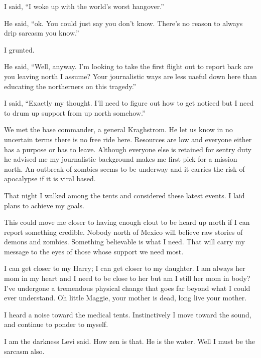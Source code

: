 I said, ``I woke up with the world's worst hangover.''

He said, ``ok. You could just say you don't know. There's no reason to always drip sarcasm you know.''

I grunted.

He said, ``Well, anyway. I'm looking to take the first flight out to report back are you leaving north I assume? Your journalistic ways are less uaeful down here than educating the northerners on this tragedy.''

I said, ``Exactly my thought. I'll need to figure out how to get noticed but I need to drum up support from up north somehow.''

We met the base commander, a general Kraghstrom. He let us know in no uncertain terms there is no free ride here. Resources are low and everyone either has a purpose or has to leave. Although everyone else is retained for sentry duty he advised me my journalistic background makes me first pick for a mission north. An outbreak of zombies seems to be underway and it carries the risk of apocalypse if it is viral based.

That night I walked among the tents and considered these latest events. I laid plans to achieve my goals.

This could move me closer to having enough clout to be heard up north if I can report something credible. Nobody north of Mexico will believe raw stories of demons and zombies. Something believable is what I need. That will carry my message to the eyes of those whose support we need most.

I can get closer to my Harry; I can get closer to my daughter. I am always her mom in my heart and I need to be close to her but am I still her mom in body? I've undergone a tremendous physical change that goes far beyond what I could ever understand. Oh little Maggie, your mother is dead, long live your mother.

I heard a noise toward the medical tents. Instinctively I move toward the sound, and continue to ponder to myself.

I am the darkness Levi said. How zen is that. He is the water. Well I must be the sarcasm also.